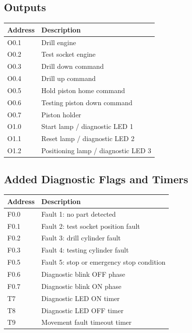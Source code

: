 \subsection{Outputs}

\begin{longtable}{|p{2.0cm}|p{10.8cm}|}
\hline
Address & Description \\
\hline
O0.1 & Drill engine \\
\hline
O0.2 & Test socket engine \\
\hline
O0.3 & Drill down command \\
\hline
O0.4 & Drill up command \\
\hline
O0.5 & Hold piston home command \\
\hline
O0.6 & Testing piston down command \\
\hline
O0.7 & Piston holder \\
\hline
O1.0 & Start lamp / diagnostic LED 1 \\
\hline
O1.1 & Reset lamp / diagnostic LED 2 \\
\hline
O1.2 & Positioning lamp / diagnostic LED 3 \\
\hline
\end{longtable}

\subsection{Added Diagnostic Flags and Timers}

\begin{longtable}{|p{2.4cm}|p{10.4cm}|}
\hline
Address & Description \\
\hline
F0.0 & Fault 1: no part detected \\
\hline
F0.1 & Fault 2: test socket position fault \\
\hline
F0.2 & Fault 3: drill cylinder fault \\
\hline
F0.3 & Fault 4: testing cylinder fault \\
\hline
F0.5 & Fault 5: stop or emergency stop condition \\
\hline
F0.6 & Diagnostic blink OFF phase \\
\hline
F0.7 & Diagnostic blink ON phase \\
\hline
T7 & Diagnostic LED ON timer \\
\hline
T8 & Diagnostic LED OFF timer \\
\hline
T9 & Movement fault timeout timer \\
\hline
\end{longtable}

